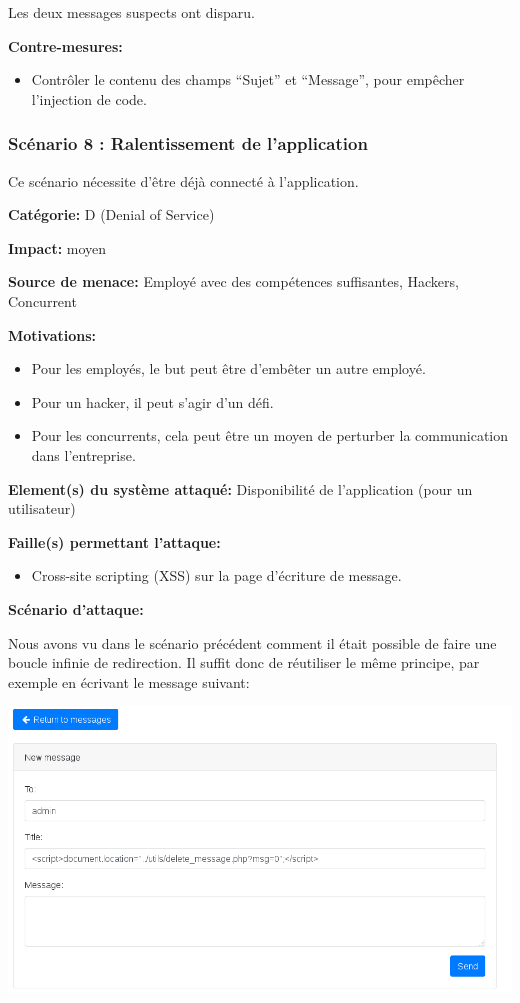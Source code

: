 \documentclass{article}
\begin{document}
Les deux messages suspects ont disparu.

\textbf{Contre-mesures:}

\begin{itemize}

\item
  Contrôler le contenu des champs ``Sujet'' et ``Message'', pour
  empêcher l'injection de code.
\end{itemize}

\subsubsection{Scénario 8 : Ralentissement de l'application}

Ce scénario nécessite d'être déjà connecté à l'application.

\textbf{Catégorie:} D (Denial of Service)

\textbf{Impact:} moyen

\textbf{Source de menace:} Employé avec des compétences suffisantes,
Hackers, Concurrent

\textbf{Motivations:}

\begin{itemize}

\item
  Pour les employés, le but peut être d'embêter un autre employé.
\item
  Pour un hacker, il peut s'agir d'un défi.
\item
  Pour les concurrents, cela peut être un moyen de perturber la
  communication dans l'entreprise.
\end{itemize}

\textbf{Element(s) du système attaqué:} Disponibilité de l'application
(pour un utilisateur)

\textbf{Faille(s) permettant l'attaque:}

\begin{itemize}

\item
  Cross-site scripting (XSS) sur la page d'écriture de message.
\end{itemize}

\textbf{Scénario d'attaque:}

Nous avons vu dans le scénario précédent comment il était possible de
faire une boucle infinie de redirection. Il suffit donc de réutiliser le
même principe, par exemple en écrivant le message suivant:

\includegraphics[width=\textwidth]{images/loop1.PNG}
\end{document}
